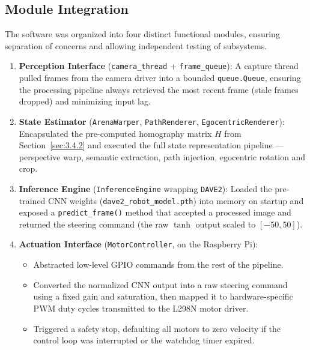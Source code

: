 \subsection{Module Integration}
\label{sec:module_integration}

The software was organized into four distinct functional modules, ensuring separation of
concerns and allowing independent testing of subsystems.

\begin{enumerate}
    \item \textbf{Perception Interface} (\texttt{camera\_thread} + \texttt{frame\_queue}):
    A capture thread pulled frames from the camera driver into a bounded
    \texttt{queue.Queue}, ensuring the processing pipeline always retrieved the most
    recent frame (stale frames dropped) and minimizing input lag.

    \item \textbf{State Estimator} (\texttt{ArenaWarper}, \texttt{PathRenderer},
    \texttt{EgocentricRenderer}): Encapsulated the pre-computed
    homography matrix $H$ from Section~\ref{sec:3.4.2} and executed the full state
    representation pipeline — perspective warp, semantic extraction, path injection,
    egocentric rotation and crop.

    \item \textbf{Inference Engine} (\texttt{InferenceEngine} wrapping \texttt{DAVE2}):
    Loaded the pre-trained CNN weights (\texttt{dave2\_robot\_model.pth}) into memory on
    startup and exposed a \texttt{predict\_frame()} method that accepted a processed image
    and returned the steering command (the raw $\tanh$ output scaled to $[-50,50]$).

    \item \textbf{Actuation Interface} (\texttt{MotorController}, on the Raspberry Pi):
    \begin{itemize}
        \item Abstracted low-level GPIO commands from the rest of the pipeline.
        \item Converted the normalized CNN output into a raw steering command using a
              fixed gain and saturation, then mapped it to hardware-specific PWM duty cycles
              transmitted to the L298N motor driver.
        \item Triggered a safety stop, defaulting all motors to zero velocity if the
              control loop was interrupted or the watchdog timer expired.
        \end{itemize}
\end{enumerate}


